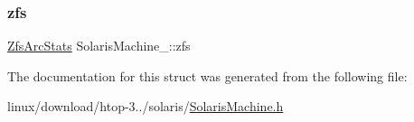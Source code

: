 \subsubsection{\texorpdfstring{zfs}{zfs}}
{\footnotesize\ttfamily \hyperlink{ZfsArcStats_8h_a2adeccbbba50329f61d34f355e5faddc}{Zfs\+Arc\+Stats} Solaris\+Machine\+\_\+\+::zfs}



The documentation for this struct was generated from the following file\+:\begin{DoxyCompactItemize}
\item 
linux/download/htop-\/3../solaris/\hyperlink{SolarisMachine_8h}{Solaris\+Machine.\+h}\end{DoxyCompactItemize}
